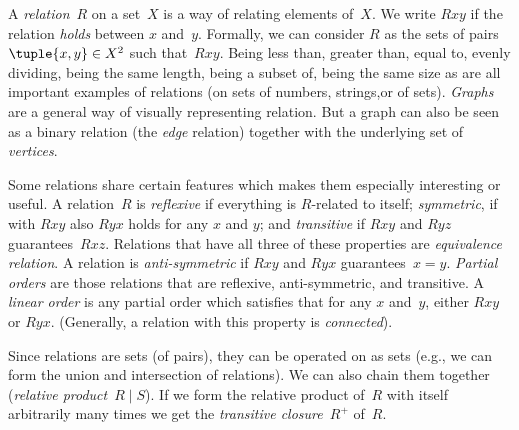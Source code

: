 A \emph{relation}~$R$ on a set~$X$ is a way of relating elements
of~$X$. We write $Rxy$ if the relation \emph{holds} between $x$
and~$y$. Formally, we can consider $R$ as the sets of pairs
$\tuple{x,y} \in X^2$ such that~$Rxy$.  Being less than, greater than,
equal to, evenly dividing, being the same length, being a subset of,
being the same size as are all important examples of relations (on
sets of numbers, strings,or of sets).  \emph{Graphs} are a general way
of visually representing relation. But a graph can also be seen as a
binary relation (the \emph{edge} relation) together with the
underlying set of \emph{vertices}.

Some relations share certain features which makes them especially
interesting or useful. A relation~$R$ is \emph{reflexive} if
everything is $R$-related to itself; \emph{symmetric}, if with $Rxy$
also $Ryx$ holds for any $x$ and $y$; and \emph{transitive} if $Rxy$
and $Ryz$ guarantees~$Rxz$. Relations that have all three of these
properties are \emph{equivalence relation}.  A relation is
\emph{anti-symmetric} if $Rxy$ and $Ryx$
guarantees~$x=y$. \emph{Partial orders} are those relations that are
reflexive, anti-symmetric, and transitive.  A \emph{linear order} is
any partial order which satisfies that for any $x$ and~$y$, either
$Rxy$ or $Ryx$. (Generally, a relation with this property is
\emph{connected}).

Since relations are sets (of pairs), they can be operated on as sets
(e.g., we can form the union and intersection of relations). We can
also chain them together (\emph{relative product}~$R \mid S$). If we
form the relative product of~$R$ with itself arbitrarily many times we
get the \emph{transitive closure}~$R^+$ of~$R$.
